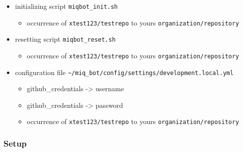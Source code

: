 \begin{itemize}
\tightlist
\item
  initializing script \texttt{miqbot\_init.sh}

  \begin{itemize}
  \tightlist
  \item
    occurrence of \texttt{xtest123/testrepo} to yours
    \texttt{organization/repository}
  \end{itemize}
\item
  resetting script \texttt{miqbot\_reset.sh}

  \begin{itemize}
  \tightlist
  \item
    occurrence of \texttt{xtest123/testrepo} to yours
    \texttt{organization/repository}
  \end{itemize}
\item
  configuration file
  \texttt{\textasciitilde{}/miq\_bot/config/settings/development.local.yml}

  \begin{itemize}
  \tightlist
  \item
    github\_credentials -\textgreater{} username
  \item
    github\_credentials -\textgreater{} password
  \item
    occurrence of \texttt{xtest123/testrepo} to yours
    \texttt{organization/repository}
  \end{itemize}
\end{itemize}

\subsubsection{Setup}\label{setup}


